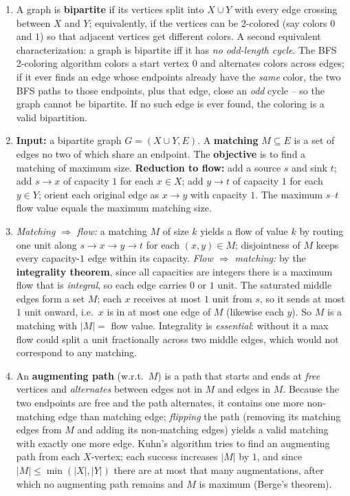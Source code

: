 \documentclass[11pt]{article}
\begin{document}
\begin{enumerate}[label=\textbf{A\arabic*.}, leftmargin=2.2em]

\item A graph is \textbf{bipartite} if its vertices split into $X \cup Y$ with
every edge crossing between $X$ and $Y$; equivalently, if the vertices can be
2-colored (say colors $0$ and $1$) so that adjacent vertices get different
colors. A second equivalent characterization: a graph is bipartite iff it has
\emph{no odd-length cycle}. The BFS 2-coloring algorithm colors a start vertex
$0$ and alternates colors across edges; if it ever finds an edge whose endpoints
already have the \emph{same} color, the two BFS paths to those endpoints, plus
that edge, close an \emph{odd} cycle -- so the graph cannot be bipartite. If no
such edge is ever found, the coloring is a valid bipartition.

\item \textbf{Input:} a bipartite graph $G = (X \cup Y, E)$. A \textbf{matching}
$M \subseteq E$ is a set of edges no two of which share an endpoint. The
\textbf{objective} is to find a matching of maximum size. \textbf{Reduction to
flow:} add a source $s$ and sink $t$; add $s \to x$ of capacity $1$ for each
$x \in X$; add $y \to t$ of capacity $1$ for each $y \in Y$; orient each original
edge as $x \to y$ with capacity $1$. The maximum $s$--$t$ flow value equals the
maximum matching size.

\item \emph{Matching $\Rightarrow$ flow:} a matching $M$ of size $k$ yields a
flow of value $k$ by routing one unit along $s \to x \to y \to t$ for each
$(x,y) \in M$; disjointness of $M$ keeps every capacity-$1$ edge within its
capacity. \emph{Flow $\Rightarrow$ matching:} by the \textbf{integrality
theorem}, since all capacities are integers there is a maximum flow that is
\emph{integral}, so each edge carries $0$ or $1$ unit. The saturated middle edges
form a set $M$; each $x$ receives at most $1$ unit from $s$, so it sends at most
$1$ unit onward, i.e.\ $x$ is in at most one edge of $M$ (likewise each $y$). So
$M$ is a matching with $|M| = $ flow value. Integrality is \emph{essential}:
without it a max flow could split a unit fractionally across two middle edges,
which would not correspond to any matching.

\item An \textbf{augmenting path} (w.r.t.\ $M$) is a path that starts and ends at
\emph{free} vertices and \emph{alternates} between edges not in $M$ and edges in
$M$. Because the two endpoints are free and the path alternates, it contains one
more non-matching edge than matching edge; \emph{flipping} the path (removing its
matching edges from $M$ and adding its non-matching edges) yields a valid
matching with exactly one more edge. Kuhn's algorithm tries to find an augmenting
path from each $X$-vertex; each success increases $|M|$ by $1$, and since
$|M| \le \min(|X|,|Y|)$ there are at most that many augmentations, after which no
augmenting path remains and $M$ is maximum (Berge's theorem).


\end{enumerate}
\end{document}

